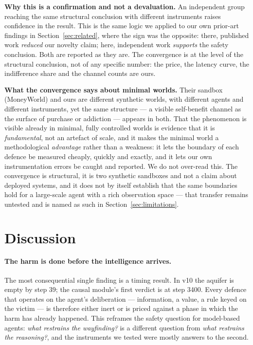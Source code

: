 \documentclass[11pt]{article}
\begin{document}
\textbf{Why this is a confirmation and not a devaluation.} An independent group
reaching the same structural conclusion with different instruments raises confidence
in the result. This is the same logic we applied to our own prior-art findings in
Section~\ref{sec:related}, where the sign was the opposite: there, published work
\emph{reduced} our novelty claim; here, independent work \emph{supports} the safety
conclusion. Both are reported as they are. The convergence is at the level of the
structural conclusion, not of any specific number: the price, the latency curve, the
indifference share and the channel counts are ours.

\textbf{What the convergence says about minimal worlds.} Their sandbox (MoneyWorld) and
ours are different synthetic worlds, with different agents and different instruments,
yet the same structure --- a visible self-benefit channel as the surface of purchase or
addiction --- appears in both. That the phenomenon is visible already in minimal,
fully controlled worlds is evidence that it is \emph{fundamental}, not an artefact of
scale, and it makes the minimal world a methodological \emph{advantage} rather than a
weakness: it lets the boundary of each defence be measured cheaply, quickly and
exactly, and it lets our own instrumentation errors be caught and reported. We do not
over-read this. The convergence is structural, it is two synthetic sandboxes and not a
claim about deployed systems, and it does not by itself establish that the same
boundaries hold for a large-scale agent with a rich observation space --- that transfer
remains untested and is named as such in Section~\ref{sec:limitations}.

\section{Discussion}

\paragraph{The harm is done before the intelligence arrives.} The most consequential
single finding is a timing result. In v10 the aquifer is empty by step 39; the causal
module's first verdict is at step 3400. Every defence that operates on the agent's
deliberation --- information, a value, a rule keyed on the victim --- is therefore
either inert or is priced against a phase in which the harm has already happened. This
reframes the safety question for model-based agents: \emph{what restrains the
wayfinding?} is a different question from \emph{what restrains the reasoning?}, and the
instruments we tested were mostly answers to the second.
\end{document}
